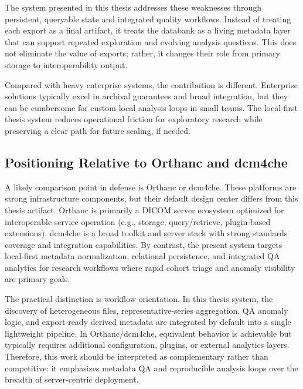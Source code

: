 The system presented in this thesis addresses these weaknesses through persistent, queryable state and integrated quality workflows. Instead of treating each export as a final artifact, it treats the databank as a living metadata layer that can support repeated exploration and evolving analysis questions. This does not eliminate the value of exports; rather, it changes their role from primary storage to interoperability output.

Compared with heavy enterprise systems, the contribution is different. Enterprise solutions typically excel in archival guarantees and broad integration, but they can be cumbersome for custom local analysis loops in small teams. The local-first thesis system reduces operational friction for exploratory research while preserving a clear path for future scaling, if needed.

\subsection{Positioning Relative to Orthanc and dcm4che}
A likely comparison point in defense is Orthanc or dcm4che. These platforms are strong infrastructure components, but their default design center differs from this thesis artifact. Orthanc is primarily a DICOM server ecosystem optimized for interoperable service operation (e.g., storage, query/retrieve, plugin-based extensions). dcm4che is a broad toolkit and server stack with strong standards coverage and integration capabilities. By contrast, the present system targets local-first metadata normalization, relational persistence, and integrated QA analytics for research workflows where rapid cohort triage and anomaly visibility are primary goals.

The practical distinction is workflow orientation. In this thesis system, the discovery of heterogeneous files, representative-series aggregation, QA anomaly logic, and export-ready derived metadata are integrated by default into a single lightweight pipeline. In Orthanc/dcm4che, equivalent behavior is achievable but typically requires additional configuration, plugins, or external analytics layers. Therefore, this work should be interpreted as complementary rather than competitive: it emphasizes metadata QA and reproducible analysis loops over the breadth of server-centric deployment.
